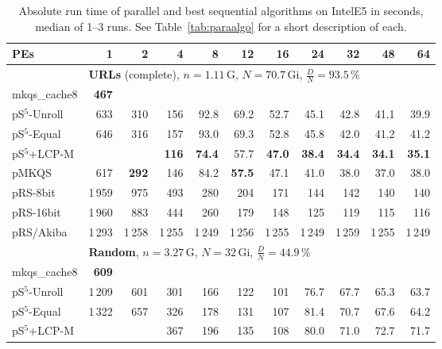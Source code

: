 \documentclass[a4paper]{myjournal}
\begin{document}
\begin{table}\centering\small
\caption{Absolute run time of parallel and best sequential algorithms on IntelE5 in seconds, median of 1--3 runs. See Table~\ref{tab:paraalgo} for a short description of each.}\label{tab:absrun-IntelE5}
\def\tabcolsep{3.6pt}
\begin{tabular}{l|*{10}{r}|@{}}
PEs & 1   & 2 & 4 & 8 & 12 & 16 & 24 & 32 & 48 & 64 \\ \hline
& \multicolumn{10}{l|}{\textbf{URLs} (complete), $n = 1.11\,\text{G}$, $N = 70.7\,\text{Gi}$, $\frac{D}{N} = 93.5\,\%$} \\ \cline{2-11}
mkqs\_cache8 & \bf 467 &  &  &  &  &  &  &  &  &  \\
pS$^5$-Unroll &    633 &     310 &     156 &     92.8 &     69.2 &     52.7 &     45.1 &     42.8 &     41.1 &     39.9 \\
 pS$^5$-Equal &    646 &     316 &     157 &     93.0 &     69.3 &     52.8 &     45.8 &     42.0 &     41.2 &     41.2 \\
 pS$^5$+LCP-M &        &         & \bf 116 & \bf 74.4 &     57.7 & \bf 47.0 & \bf 38.4 & \bf 34.4 & \bf 34.1 & \bf 35.1 \\
        pMKQS &    617 & \bf 292 &     146 &     84.2 & \bf 57.5 &     47.1 &     41.0 &     38.0 &     37.0 &     38.0 \\
     pRS-8bit & 1\,959 &     975 &     493 &      280 &      204 &      171 &      144 &      142 &      140 &      140 \\
    pRS-16bit & 1\,960 &     883 &     444 &      260 &      179 &      148 &      125 &      119 &      115 &      116 \\
    pRS/Akiba & 1\,293 &  1\,258 &  1\,255 &   1\,249 &   1\,256 &   1\,255 &   1\,249 &   1\,259 &   1\,255 &   1\,249 \\ \hline
& \multicolumn{10}{l|}{\textbf{Random}, $n = 3.27\,\text{G}$, $N = 32\,\text{Gi}$, $\frac{D}{N} = 44.9\,\%$} \\ \cline{2-11}
mkqs\_cache8 & \bf 609 &  &  &  &  &  &  &  &  &  \\
pS$^5$-Unroll & 1\,209 &     601 &     301 &     166 &      122 &      101 &     76.7 &     67.7 &     65.3 &     63.7 \\
 pS$^5$-Equal & 1\,322 &     657 &     326 &     178 &      131 &      107 &     81.4 &     70.7 &     67.6 &     64.2 \\
 pS$^5$+LCP-M &        &         &     367 &     196 &      135 &      108 &     80.0 &     71.0 &     72.7 &     71.7 \\

\end{tabular}
\end{table}
\end{document}
